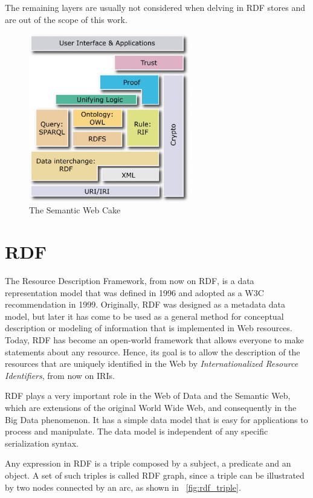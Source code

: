 \documentclass[10pt, a4paper]{report}
\begin{document}
The remaining layers are usually not considered when delving in RDF stores and are out of the scope of this work.

\begin{figure}
	\centering
	\includegraphics[width=7cm]{./assets/img/semantic_web_cake.jpg}
	\caption{The Semantic Web Cake}
	\label{fig:semantic_web_cake}
	\vspace{0.5cm}
\end{figure}

\section{RDF}

The Resource Description Framework, from now on RDF, is a data representation model that was defined in 1996 and adopted as a W3C recommendation in 1999. Originally, RDF was designed as a metadata data model, but later it has come to be used as a general method for conceptual description or modeling of information that is implemented in Web resources. Today, RDF has become an open-world framework that allows everyone to make statements about any resource. Hence, its goal is to allow the description of the resources that are uniquely identified in the Web by \textit{Internationalized Resource Identifiers}, from now on IRIs.

RDF plays a very important role in the Web of Data and the Semantic Web, which are extensions of the original World Wide Web, and consequently in the Big Data phenomenon. It has a simple data model that is easy for applications to process and manipulate. The data model is independent of any specific serialization syntax.

Any expression in RDF is a triple composed by a subject, a predicate and an object. A set of such triples is called RDF graph, since a triple can be illustrated by two nodes connected by an arc, as shown in \figurename~\ref{fig:rdf_triple}.
\end{document}
